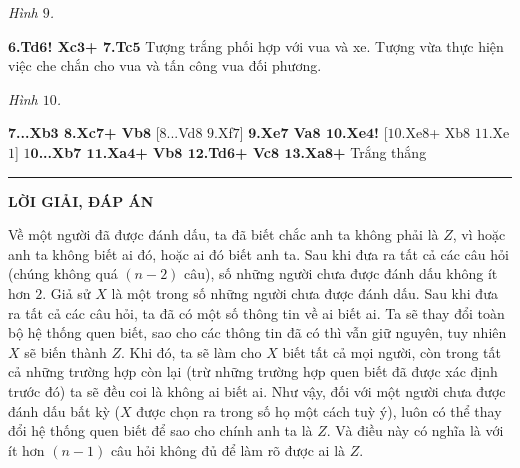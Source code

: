 \begin{multicols}{2}
\begin{center}
		\scalebox{0.85}\showboard
		\vskip 0.1cm
		\textit{\small\color{gocco}Hình $9$.}
	\end{center}
	\textbf{\color{gocco}$\pmb{6}$.Td$\pmb{6}$! Xc$\pmb{3}$+ $\pmb{7}$.Tc$\pmb{5}$}  
	\vskip 0.1cm
	Tượng trắng phối hợp với vua và xe. Tượng vừa thực hiện việc che chắn cho vua và tấn công vua đối phương.
	\begin{center}
		\newgame
		\scalebox{0.85}\showboard
		\vskip 0.1cm
		\textit{\small\color{gocco}Hình $10$.}
	\end{center}
	\textbf{\color{gocco}$\pmb{7}$...Xb$\pmb{3}$ $\pmb{8}$.Xc$\pmb{7}$+ Vb$\pmb{8}$} [$8$...Vd$8$ $9$.Xf$7$]
	\vskip 0.1cm
	\textbf{\color{gocco}$\pmb{9}$.Xe$\pmb{7}$ Va$\pmb{8}$ $\pmb{10}$.Xe$\pmb{4}$!} [$10$.Xe$8$+ Xb$8$ $11$.Xe$1$]
	\vskip 0.1cm
	\textbf{\color{gocco}$1\pmb{0}$...Xb$\pmb{7}$ $\pmb{11}$.Xa$\pmb{4}$+ Vb$\pmb{8}$ $\pmb{12}$.Td$\pmb{6}$+ Vc$\pmb{8}$ $\pmb{13}$.Xa$\pmb{8}$+} Trắng thắng
\end{multicols}
\vspace*{-10pt}
{\rule{1\linewidth}{0.1pt}}
\vskip 0.2cm
\centerline{\LARGE\textbf{\color{gocco}LỜI GIẢI, ĐÁP ÁN}}
\begin{multicols}{2}
	 Về một người đã được đánh dấu, ta đã biết chắc anh ta không phải là $Z$, vì hoặc anh ta không biết ai đó, hoặc ai đó biết anh ta. Sau khi đưa ra tất cả các câu hỏi (chúng không quá $(n-2)$ câu), số những người chưa được đánh dấu không ít hơn $2$. 
	\vskip 0.1cm
	Giả sử $X$ là một trong số những người chưa được đánh dấu. Sau khi đưa ra tất cả các câu hỏi, ta đã có một số thông tin về ai biết ai. Ta sẽ thay đổi toàn bộ hệ thống quen biết, sao cho các thông tin đã có  thì vẫn giữ nguyên, tuy nhiên $X$ sẽ biến thành $Z$. Khi đó, ta sẽ làm cho $X$ biết tất cả mọi người, còn trong tất cả những trường hợp còn lại (trừ những trường hợp quen biết đã được xác định trước đó) ta sẽ đều coi là không ai biết ai.
	\vskip 0.1cm
	Như vậy, đối với một người chưa được đánh dấu bất kỳ ($X$ được chọn ra trong số họ một cách tuỳ ý), luôn có thể thay đổi hệ thống quen biết để sao cho chính anh ta là $Z$. Và điều này có nghĩa là với ít hơn $(n-1)$ câu hỏi không đủ để làm rõ được ai là $Z$.
\end{multicols}